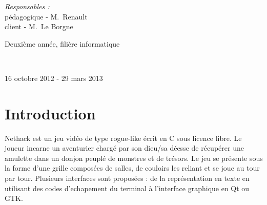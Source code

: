 \documentclass[12pt]{article}
\begin{document}
\begin{center}
\begin{center}
                    
                    \begin{flushright} 
                      \large
                      \emph{Responsables :} \\
					  {\small pédagogique} - M.~Renault \\
						  {\small client} - M.~Le Borgne\\
                    \end{flushright}
                  \end{center}
                  
                  
{}
                  
{\large Deuxième année, filière informatique}

~

{\large 16 octobre 2012 - 29 mars 2013}\\
                  
\end{center}
\thispagestyle{empty}
\pagebreak






\section{Introduction}

Nethack est un jeu vidéo de type rogue-like écrit en C sous licence libre. Le joueur incarne un aventurier chargé par son dieu/sa déesse de récupérer une amulette dans un donjon peuplé de monstres et de trésors. Le jeu se présente sous la forme d'une grille composées de salles, de couloirs les reliant et se joue au tour par tour. Plusieurs interfaces sont proposées : de la représentation en texte en utilisant des codes d'echapement du terminal à l'interface graphique en Qt ou GTK.
\end{document}
